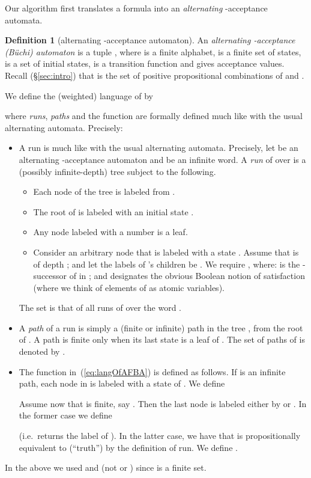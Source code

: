 \documentclass[a4paper,USenglish,numberwithinsect]{lipics}
\newif\ifignore \ignorefalse
\newcommand{\auxproof}[1]{
\ifignore\mbox{}\newline
\textbf{BEGIN: AUX-PROOF} \dotfill\newline
{#1}\mbox{}\newline
\textbf{END: AUX-PROOF}\dotfill\newline
\fi}
\theoremstyle{definition}
\newtheorem{defi}{Definition}[section]
\theoremstyle{remark}
\theoremstyle{plain}
\begin{document}
 Our algorithm first translates a formula    into an
\emph{alternating} -acceptance automata. 
\begin{defi}[alternating {}-acceptance automaton]\label{def:alternative_buchi}
  An \emph{alternating {}-acceptance (B\"uchi) automaton} is a tuple , where  is a finite alphabet,
  is a finite set of states,  is a set of initial
 states,  is a transition function and  gives
 acceptance values.  Recall (\S{}\ref{sec:intro})
 that  is the set of positive
 propositional combinations of  and .



  We define the (weighted) language  of  by
  
  where \emph{runs}, \emph{paths} and the function  are
 formally defined much like with the usual alternating
 automata. Precisely:
 \begin{itemize}
  \item A run is much like with the usual alternating
 automata. Precisely, let  be an alternating
	-acceptance automaton and 
  be an infinite word.
	A \emph{run}  of   over 
  is a (possibly infinite-depth) tree subject to the following.
	\begin{itemize}
	 \item Each node  of the tree  is labeled from .
\auxproof{	       That is, either by a state 
	       or a number .
}
	 \item The root of  is labeled with an initial state
	       .
	 \item Any node  labeled with a number  is a leaf.
	 \item Consider an arbitrary node  that is labeled 
	with a state . Assume that  is of depth ; and 
	       let the labels of 's children be .
We require  
	       , where:  is the
	       -successor of  in ; and 
	       designates the obvious Boolean notion of satisfaction
	       (where we think of elements of  as atomic variables).
	\end{itemize}
	The set  is that of all runs of  over the word
	.
  \item A \emph{path}  of a run  is simply a (finite or
	infinite) path in the tree , from the root of . 
	A path  is finite only
	when its last state is a leaf of .
	The set of paths of  is denoted by .
  \item The function 
 in~(\ref{eq:langOfAFBA}) is defined as follows. 
	If  is an
	infinite path,  each node  in  is labeled with
	a state  of . We define
 
	Assume now that  is finite, say
	. Then the last node 
	is labeled either by  or .
	In the former case we define
	 
	(i.e.\  returns the label of ).
 In the latter
	case,
we have that  is
	propositionally equivalent to  (``truth'') by the
	definition of run. We define
	.
\end{itemize}
\end{defi}
In the above we used  and  (not 
or ) since  is a finite set.
\end{document}
